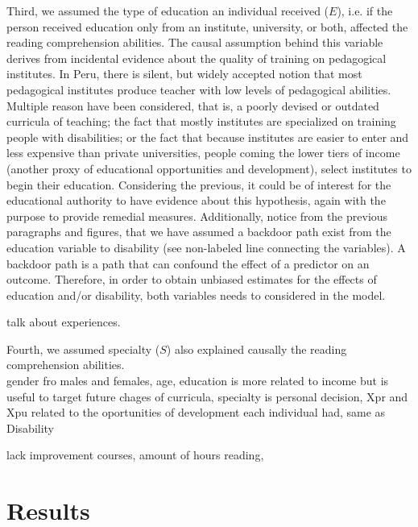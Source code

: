 Third, we assumed the type of education an individual received ($E$), i.e. if the person received education only from an institute, university, or both, affected the reading comprehension abilities. The causal assumption behind this variable derives from incidental evidence about the quality of training on pedagogical institutes. In Peru, there is silent, but widely accepted notion that most pedagogical institutes produce teacher with low levels of pedagogical abilities. Multiple reason have been considered, that is, a poorly devised or outdated curricula of teaching; the fact that mostly institutes are specialized on training people with disabilities; or the fact that because institutes are easier to enter and less expensive than private universities, people coming the lower tiers of income (another proxy of educational opportunities and development), select institutes to begin their education. Considering the previous, it could be of interest for the educational authority to have evidence about this hypothesis, again with the purpose to provide remedial measures. Additionally, notice from the previous paragraphs and figures, that we have assumed a backdoor path exist from the education variable to disability (see non-labeled line connecting the variables). A backdoor path is a path that can confound the effect of a predictor on an outcome. Therefore, in order to obtain unbiased estimates for the effects of education and/or disability, both variables needs to considered in the model. 

talk about experiences.

Fourth, we assumed specialty ($S$) also explained causally the reading comprehension abilities. \\

gender fro males and females, age, education is more related to income but is useful to target future chages of curricula, specialty is personal decision, Xpr and Xpu related to the oportunities of development each individual had, same as Disability

lack improvement courses, amount of hours reading, 



\section{Results}


